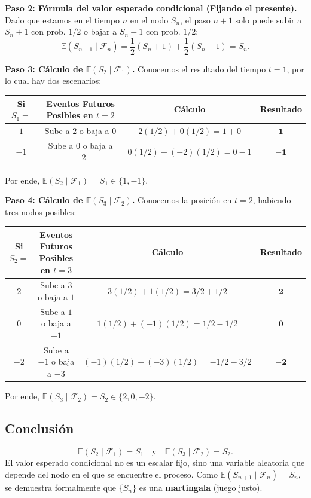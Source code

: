 \documentclass[11pt, a4paper]{article}
\begin{document}
\textbf{Paso 2: Fórmula del valor esperado condicional (Fijando el presente).}
Dado que estamos en el tiempo $n$ en el nodo $S_n$, el paso $n+1$ solo puede subir a $S_n + 1$ con prob. $1/2$ o bajar a $S_n - 1$ con prob. $1/2$:
\[
\mathbb{E}(S_{n+1} \mid \mathcal{F}_n) = \frac{1}{2}(S_n + 1) + \frac{1}{2}(S_n - 1) = S_n.
\]

\textbf{Paso 3: Cálculo de $\mathbb{E}(S_2 \mid \mathcal{F}_1)$.}
Conocemos el resultado del tiempo $t=1$, por lo cual hay dos escenarios:
\begin{center}
\begin{tabular}{cccc}
\toprule
Si $S_1 =$ & Eventos Futuros Posibles en $t=2$ & Cálculo & Resultado \\
\midrule
$1$ & Sube a $2$ o baja a $0$ & $2(1/2) + 0(1/2) = 1 + 0$ & $\mathbf{1}$ \\
$-1$ & Sube a $0$ o baja a $-2$ & $0(1/2) + (-2)(1/2) = 0 - 1$ & $\mathbf{-1}$ \\
\bottomrule
\end{tabular}
\end{center}
Por ende, $\mathbb{E}(S_2 \mid \mathcal{F}_1) = S_1 \in \{1, -1\}$.

\textbf{Paso 4: Cálculo de $\mathbb{E}(S_3 \mid \mathcal{F}_2)$.}
Conocemos la posición en $t=2$, habiendo tres nodos posibles:
\begin{center}
\begin{tabular}{cccc}
\toprule
Si $S_2 =$ & Eventos Futuros Posibles en $t=3$ & Cálculo & Resultado \\
\midrule
$2$ & Sube a $3$ o baja a $1$ & $3(1/2) + 1(1/2) = 3/2 + 1/2$ & $\mathbf{2}$ \\
$0$ & Sube a $1$ o baja a $-1$ & $1(1/2) + (-1)(1/2) = 1/2 - 1/2$ & $\mathbf{0}$ \\
$-2$ & Sube a $-1$ o baja a $-3$ & $(-1)(1/2) + (-3)(1/2) = -1/2 - 3/2$ & $\mathbf{-2}$ \\
\bottomrule
\end{tabular}
\end{center}
Por ende, $\mathbb{E}(S_3 \mid \mathcal{F}_2) = S_2 \in \{2, 0, -2\}$.

\subsection*{Conclusión}
\[
\mathbb{E}(S_2 \mid \mathcal{F}_1) = S_1 \quad \text{y} \quad \mathbb{E}(S_3 \mid \mathcal{F}_2) = S_2.
\]
El valor esperado condicional no es un escalar fijo, sino una variable aleatoria que depende del nodo en el que se encuentre el proceso. Como $\mathbb{E}(S_{n+1} \mid \mathcal{F}_n) = S_n$, se demuestra formalmente que $\{S_n\}$ es una \textbf{martingala} (juego justo).
\end{document}
